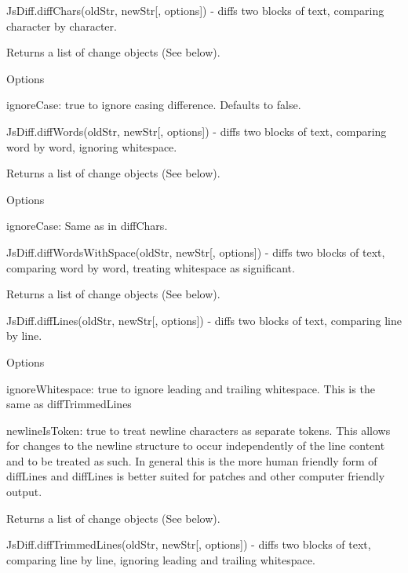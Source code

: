 \begin{DoxyItemize}
\item {\ttfamily Js\+Diff.\+diff\+Chars(old\+Str, new\+Str\mbox{[}, options\mbox{]})} -\/ diffs two blocks of text, comparing character by character.

Returns a list of change objects (See below).

Options
\begin{DoxyItemize}
\item {\ttfamily ignore\+Case}\+: {\ttfamily true} to ignore casing difference. Defaults to {\ttfamily false}.
\end{DoxyItemize}
\item {\ttfamily Js\+Diff.\+diff\+Words(old\+Str, new\+Str\mbox{[}, options\mbox{]})} -\/ diffs two blocks of text, comparing word by word, ignoring whitespace.

Returns a list of change objects (See below).

Options
\begin{DoxyItemize}
\item {\ttfamily ignore\+Case}\+: Same as in {\ttfamily diff\+Chars}.
\end{DoxyItemize}
\item {\ttfamily Js\+Diff.\+diff\+Words\+With\+Space(old\+Str, new\+Str\mbox{[}, options\mbox{]})} -\/ diffs two blocks of text, comparing word by word, treating whitespace as significant.

Returns a list of change objects (See below).
\item {\ttfamily Js\+Diff.\+diff\+Lines(old\+Str, new\+Str\mbox{[}, options\mbox{]})} -\/ diffs two blocks of text, comparing line by line.

Options
\begin{DoxyItemize}
\item {\ttfamily ignore\+Whitespace}\+: {\ttfamily true} to ignore leading and trailing whitespace. This is the same as {\ttfamily diff\+Trimmed\+Lines}
\item {\ttfamily newline\+Is\+Token}\+: {\ttfamily true} to treat newline characters as separate tokens. This allows for changes to the newline structure to occur independently of the line content and to be treated as such. In general this is the more human friendly form of {\ttfamily diff\+Lines} and {\ttfamily diff\+Lines} is better suited for patches and other computer friendly output.
\end{DoxyItemize}

Returns a list of change objects (See below).
\item {\ttfamily Js\+Diff.\+diff\+Trimmed\+Lines(old\+Str, new\+Str\mbox{[}, options\mbox{]})} -\/ diffs two blocks of text, comparing line by line, ignoring leading and trailing whitespace.


\end{DoxyItemize}
